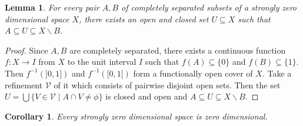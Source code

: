 \documentclass[12pt,oneside,english]{amsbook}
\numberwithin{equation}{section} %
\numberwithin{figure}{section} %
\theoremstyle{plain}
\numberwithin{section}{chapter}
\theoremstyle{plain}
\newtheorem{lem}[thm]{Lemma}
\newtheorem{corollary}[thm]{Corollary}
\begin{document}
\begin{lem}\label{connectedness:18}
  For every pair $A,B$ of completely separated subsets of a strongly zero dimensional space $X$, there exists an open and closed set $U \subseteq X$ such that $A \subseteq U \subseteq X \backslash B$.
\end{lem}
\begin{proof}
  Since $A,B$ are completely separated, there exists a continuous function $f: X \to I$ from $X$ to the unit interval $I$ such that $f(A) \subseteq \{0\}$ and $f(B) \subseteq \{1\}$. Then $f^{-1}(]0,1])$ and $f^{-1}([0,1[)$ form a functionally open cover of $X$. Take a refinement $\mathcal{V}$ of it which consists of pairwise disjoint open sets. Then the set $U = \bigcup\{V \in \mathcal{V} \; | \; A \cap V \neq \phi \}$ is closed and open and $A \subseteq U \subseteq X \backslash B$.
\end{proof}

\begin{corollary}\label{connectedness:19}
  Every strongly zero dimensional space is zero dimensional.
\end{corollary}
\end{document}
